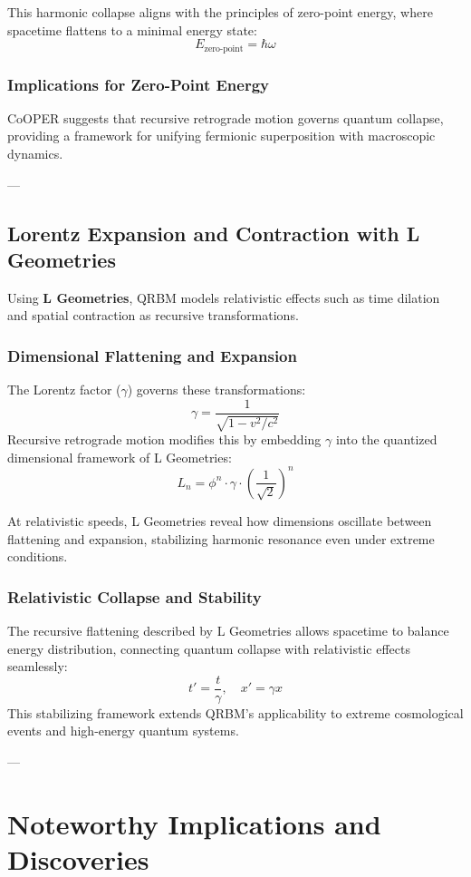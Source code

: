 \documentclass{article}
\begin{document}
This harmonic collapse aligns with the principles of zero-point energy, where spacetime flattens to a minimal energy state:
\[
E_{\text{zero-point}} = \hbar \omega
\]

\subsubsection*{Implications for Zero-Point Energy}
CoOPER suggests that recursive retrograde motion governs quantum collapse, providing a framework for unifying fermionic superposition with macroscopic dynamics.

---

\subsection*{Lorentz Expansion and Contraction with L Geometries}
Using \textbf{L Geometries}, QRBM models relativistic effects such as time dilation and spatial contraction as recursive transformations.

\subsubsection*{Dimensional Flattening and Expansion}
The Lorentz factor (\(\gamma\)) governs these transformations:
\[
\gamma = \frac{1}{\sqrt{1 - v^2/c^2}}
\]
Recursive retrograde motion modifies this by embedding \(\gamma\) into the quantized dimensional framework of L Geometries:
\[
L_n = \phi^n \cdot \gamma \cdot \left( \frac{1}{\sqrt{2}} \right)^n
\]

At relativistic speeds, L Geometries reveal how dimensions oscillate between flattening and expansion, stabilizing harmonic resonance even under extreme conditions.

\subsubsection*{Relativistic Collapse and Stability}
The recursive flattening described by L Geometries allows spacetime to balance energy distribution, connecting quantum collapse with relativistic effects seamlessly:
\[
t' = \frac{t}{\gamma}, \quad x' = \gamma x
\]
This stabilizing framework extends QRBM’s applicability to extreme cosmological events and high-energy quantum systems.

---

\section*{Noteworthy Implications and Discoveries}
\end{document}
